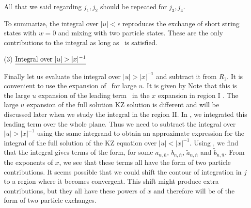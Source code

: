All that we said regarding $j_1,j_2$ should be repeated for
$j_3,j_4$.

To summarize, the integral over $|u| < \epsilon$
reproduces the exchange of short string states
with $w=0$ and mixing with two particle states. These
are the only contributions to the integral as long
as \physcond\ is satisfied.

\bigskip
\noindent
(3) $\underline{{\rm Integral~over~}|u| > |x|^{-1}}$

Finally let us evaluate the integral over $|u| > |x|^{-1}$
and subtract it from $R_1$.
It is convenient to use the expansion
of \monodinv\ for large $u$. It is   given by
\eqn{}
Note that this is the large $u$ expansion of the leading term
 \monodinv\ in the $x$ expansion in region I  \regionone .
 The large $u$ expansion of the full solution KZ solution is different
and
will be discussed later when we study the
integral in the region II.
In \integral ,  we integrated this leading term
over the whole plane. Thus we need to subtract the integral over
$|u|>|x|^{-1}$ using the same integrand to obtain
an approximate expression for the integral
of the full solution of the KZ equation over $|u|<|x|^{-1}$.
 Using \largeu , we find that the integral gives terms of the form,
\eqn{}
for some $a_{n,\bar n}$, $b_{n, \bar n}$, $\tilde a_{n, \bar n}$
and $\tilde b_{n, \bar n}$.
{}From the exponents of $x$,
we see that these terms all have the form of two particle contributions.
It seems possible that we could shift the contour of integration in $j$
to a region where it becomes convergent. This shift might produce
extra contributions, but they all have these powers of $x$ and therefore
 will be of the form of two particle exchanges.

